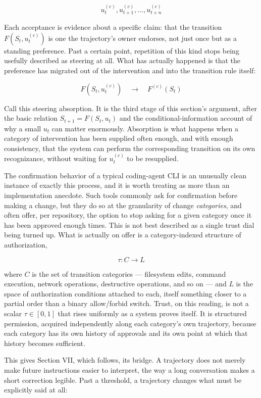 \documentclass[11pt]{article}
\begin{document}
\[
u_t^{(c)}, u_{t+1}^{(c)}, \ldots, u_{t+n}^{(c)}
\]

Each acceptance is evidence about a specific claim: that the transition $F(S_t, u_t^{(c)})$ is one the trajectory's owner endorses, not just once but as a standing preference. Past a certain point, repetition of this kind stops being usefully described as steering at all. What has actually happened is that the preference has migrated out of the intervention and into the transition rule itself:

\[
F(S_t, u_t^{(c)}) \quad \longrightarrow \quad F^{(c)}(S_t)
\]

Call this steering absorption. It is the third stage of this section's argument, after the basic relation $S_{t+1} = F(S_t, u_t)$ and the conditional-information account of why a small $u_t$ can matter enormously. Absorption is what happens when a category of intervention has been supplied often enough, and with enough consistency, that the system can perform the corresponding transition on its own recognizance, without waiting for $u_t^{(c)}$ to be resupplied.

The confirmation behavior of a typical coding-agent CLI is an unusually clean instance of exactly this process, and it is worth treating as more than an implementation anecdote. Such tools commonly ask for confirmation before making a change, but they do so at the granularity of change \emph{categories}, and often offer, per repository, the option to stop asking for a given category once it has been approved enough times. This is not best described as a single trust dial being turned up. What is actually on offer is a category-indexed structure of authorization,

\[
\tau : C \to L
\]

where $C$ is the set of transition categories --- filesystem edits, command execution, network operations, destructive operations, and so on --- and $L$ is the space of authorization conditions attached to each, itself something closer to a partial order than a binary allow/forbid switch. Trust, on this reading, is not a scalar $\tau \in [0,1]$ that rises uniformly as a system proves itself. It is structured permission, acquired independently along each category's own trajectory, because each category has its own history of approvals and its own point at which that history becomes sufficient.

This gives Section VII, which follows, its bridge. A trajectory does not merely make future instructions easier to interpret, the way a long conversation makes a short correction legible. Past a threshold, a trajectory changes what must be explicitly said at all:
\end{document}
